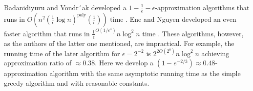 Badanidiyuru and Vondr´ak developed a $1 - \frac{1}{e} - \epsilon$-approximation 
algorithms that runs in 
$O(n^2(\frac{1}{\epsilon}\log n)^\text{poly}(\frac{1}{\epsilon}))$ time 
\cite{badanidiyuru2014fast}.
Ene and Nguyen developed an even faster algorithm that runs in 
$\frac{1}{\epsilon}^{O(1/\epsilon^4)}n \log^2 n$ time
\cite{Alina2017}.
These algorithms, however, 
as the authors of the latter one mentioned, are impractical.
For example, the running time of the later algorithm for $\epsilon = 2^{-2}$ is
$2^{2O(2^{8})}n\log^2n$ achieving approximation ratio of $\approx 0.38$.
Here we develop a $(1 - e^{-2/3}) \approx 0.48$-approximation algorithm with the same
asymptotic running time as the simple greedy algorithm and with reasonable constants.
